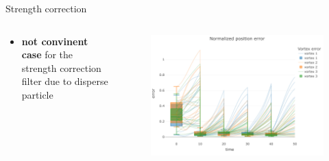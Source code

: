 \documentclass[aspectratio=169]{beamer} %
\begin{document}
\begin{frame}{Strength correction}
    \begin{columns}
        \begin{column}{0.5\textwidth}
            \begin{itemize}
                \item \textbf{not convinent case} for the strength correction filter due to disperse particle
            \end{itemize}

            \begin{figure}
                \centering
            \end{figure}
        \end{column}
        \begin{column}{0.5\textwidth}
            \begin{figure}

                \centering
                \includegraphics[width=\textwidth]{images/error_position_w_assim.pdf}
            \end{figure}
        \end{column}
    \end{columns}
\end{frame}
\end{document}
